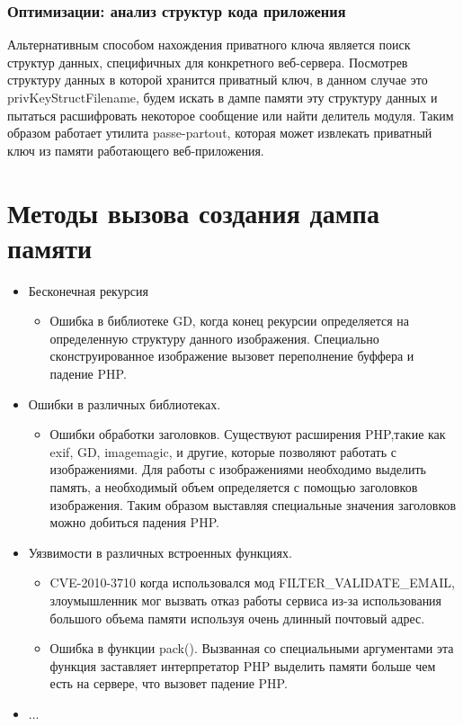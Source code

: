 \documentclass[20pt]{article}
\begin{document}
\subsubsection{Оптимизации: анализ структур кода приложения}
Альтернативным способом нахождения приватного ключа является поиск структур
данных, специфичных для конкретного веб-сервера. Посмотрев структуру данных в которой
хранится приватный ключ, в данном случае это {{privKeyStructFilename}}, будем искать
в дампе памяти эту структуру данных и пытаться расшифровать некоторое сообщение
или найти делитель модуля. Таким образом работает утилита passe-partout, которая
может извлекать приватный ключ из памяти работающего веб-приложения.

\newpage

\section{Методы вызова создания дампа памяти}

\begin{itemize}
  \item  Бесконечная рекурсия
    \begin{itemize}
      \item Ошибка в библиотеке GD, когда конец рекурсии определяется на определенную
      структуру данного изображения. Специально сконструированное изображение вызовет
      переполнение буффера и падение PHP.
    \end{itemize}
  \item Ошибки в различных библиотеках.
    \begin{itemize}
      \item Ошибки обработки заголовков. Существуют расширения PHP,такие как exif, GD,
        imagemagic, и другие, которые позволяют работать с изображениями. Для работы
        с изображениями необходимо выделить память, а необходимый объем определяется
        с помощью заголовков изображения. Таким образом выставляя специальные значения
        заголовков можно добиться падения PHP.
    \end{itemize}
  \item Уязвимости в различных встроенных функциях.
    \begin{itemize}
      \item CVE-2010-3710 когда использовался мод FILTER\_VALIDATE\_EMAIL, злоумышленник
        мог вызвать отказ работы сервиса из-за использования большого объема памяти
        используя очень длинный почтовый адрес.
      \item Ошибка в функции pack(). Вызванная со специальными аргументами эта функция
        заставляет интерпретатор PHP выделить памяти больше чем есть на сервере, что
        вызовет падение PHP.
    \end{itemize}
 \item ...
\end{itemize}
\end{document}

